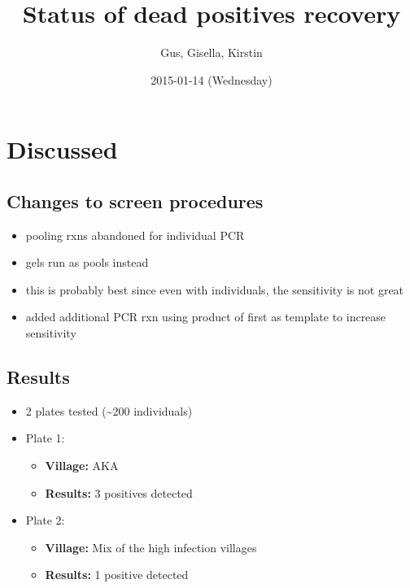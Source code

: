 \documentclass[letterpaper]{scrartcl}
\title{Status of dead positives recovery\\\vspace{0.5em}{\large Meeting notes}}
\author{Gus, Gisella, Kirstin}
\date{2015-01-14 (Wednesday)}
\begin{document}
\maketitle

{
\hypersetup{linkcolor=black}
\setcounter{tocdepth}{3}
\tableofcontents
}
\section{Discussed}\label{discussed}

\subsection{Changes to screen
procedures}\label{changes-to-screen-procedures}

\begin{itemize}
\itemsep1pt\parskip0pt
\item
  pooling rxns abandoned for individual PCR
\item
  gels run as pools instead
\item
  this is probably best since even with individuals, the sensitivity is
  not great
\item
  added additional PCR rxn using product of first as template to
  increase sensitivity
\end{itemize}

\subsection{Results}\label{results}

\begin{itemize}
\itemsep1pt\parskip0pt
\item
  2 plates tested (\textasciitilde{}200 individuals)
\item
  Plate 1:

  \begin{itemize}
  \itemsep1pt\parskip0pt
  \item
    \textbf{Village:} AKA
  \item
    \textbf{Results:} 3 positives detected
  \end{itemize}
\item
  Plate 2:

  \begin{itemize}
  \itemsep1pt\parskip0pt
  \item
    \textbf{Village:} Mix of the high infection villages
  \item
    \textbf{Results:} 1 positive detected
  \end{itemize}
\end{itemize}
\end{document}
